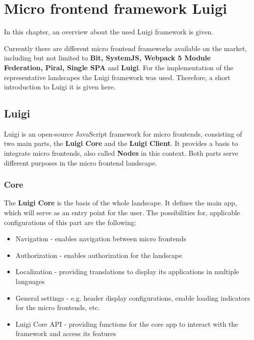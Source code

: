 \chapter{Micro frontend framework Luigi} %
\label{Chapter2}


In this chapter, an overview about the used Luigi framework is given.

Currently there are different micro frontend frameworks available on the market, including but not limited to \textbf{Bit, SystemJS, Webpack 5 Module Federation, Piral, Single SPA} and \textbf{Luigi}.\cite{top10_mffs}
For the implementation of the representative landscapes the Luigi framework was used. Therefore, a short introduction to Luigi it is given here.

\section{Luigi}

Luigi is an open-source JavaScript framework for micro frontends, consisting of two main parts, the \textbf{Luigi Core} and the \textbf{Luigi Client}. It provides a basis to integrate micro frontends, also called \textbf{Nodes} in this context. Both parts serve different purposes in the micro frontend landscape.\cite{luigi_doc_overview}

\subsection{Core}

The \textbf{Luigi Core} is the basis of the whole landscape. It defines the main app, which will serve as an entry point for the user. The possibilities for, applicable configurations of this part are the following:

\begin{itemize}[noitemsep]
	\item Navigation - enables navigation between micro frontends
	\item Authorization - enables authorization for the landscape
	\item Localization - providing translations to display its applications in multiple languages
	\item General settings - e.g. header display configurations, enable loading indicators for the micro frontends, etc.
	\item Luigi Core API - providing functions for the core app to interact with the framework and access its features
\end{itemize} 


